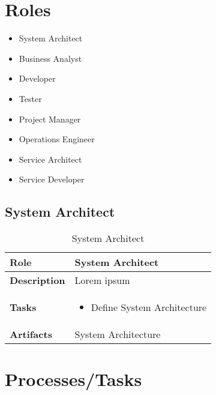 \section{Roles} 
\begin{itemize}
	\item System Architect 
	\item Business Analyst 
	\item Developer 
	\item Tester 
	\item Project Manager 
	\item Operations Engineer 
	\item Service Architect 
	\item Service Developer
\end{itemize}

\subsection{System Architect} 
\begin{table}
	[h!] \caption{System Architect} \label{table:ch6_Role_System_Architect} \centering 
	\begin{tabular}
		{|m{2cm}|m{10cm}|} \hline \bfseries Role & System Architect\\
		\hline \bfseries Description & Lorem ipsum\\
		\hline \bfseries Tasks & 
		\begin{itemize}
			\item Define System Architecture 
		\end{itemize}
		\\
		\hline \bfseries Artifacts & System Architecture\\
		\hline 
	\end{tabular}
\end{table}

\section{Processes/Tasks} 

